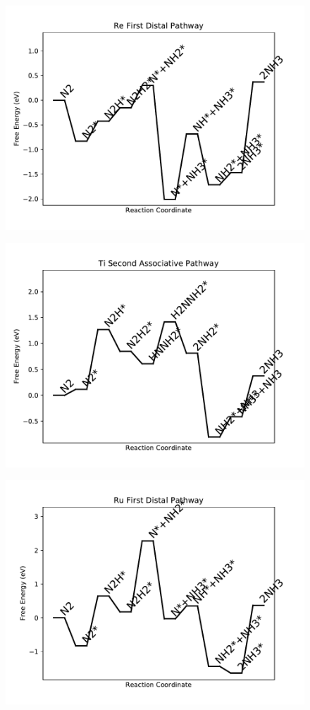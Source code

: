 \begin{figure}
\centering
\includegraphics[width=0.8\linewidth]{data/plots/Re_distal_1.pdf}
\end{figure}

\begin{figure}
\centering
\includegraphics[width=0.8\linewidth]{data/plots/Ti_associative_2.pdf}
\end{figure}

\begin{figure}
\centering
\includegraphics[width=0.8\linewidth]{data/plots/Ru_distal_1.pdf}
\end{figure}

